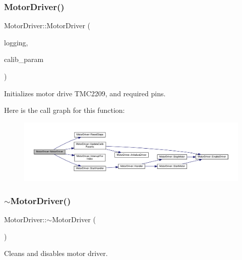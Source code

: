 \subsubsection{\texorpdfstring{Motor\+Driver()}{MotorDriver()}\hspace{0.1cm}{\footnotesize\ttfamily [2/2]}}
{\footnotesize\ttfamily Motor\+Driver\+::\+Motor\+Driver (\begin{DoxyParamCaption}\item[{std\+::shared\+\_\+ptr$<$ \hyperlink{classLogging}{Logging} $>$ \&}]{logging,  }\item[{\hyperlink{structCONFIG__SET_1_1CALIB__PARAMS}{C\+O\+N\+F\+I\+G\+\_\+\+S\+E\+T\+::\+C\+A\+L\+I\+B\+\_\+\+P\+A\+R\+A\+MS}}]{calib\+\_\+param }\end{DoxyParamCaption})}



Initializes motor drive T\+M\+C2209, and required pins. 

Here is the call graph for this function\+:
\nopagebreak
\begin{figure}[H]
\begin{center}
\leavevmode
\includegraphics[width=350pt]{classMotorDriver_a534f4ca22b5dcffc9e40aafef09c76e5_cgraph}
\end{center}
\end{figure}
\mbox{\label{classMotorDriver_a6ead9d8f796501adf9889a8e5aa7afc5}} 
\subsubsection{\texorpdfstring{$\sim$\+Motor\+Driver()}{~MotorDriver()}}
{\footnotesize\ttfamily Motor\+Driver\+::$\sim$\+Motor\+Driver (\begin{DoxyParamCaption}{ }\end{DoxyParamCaption})}



Cleans and disables motor driver. 

